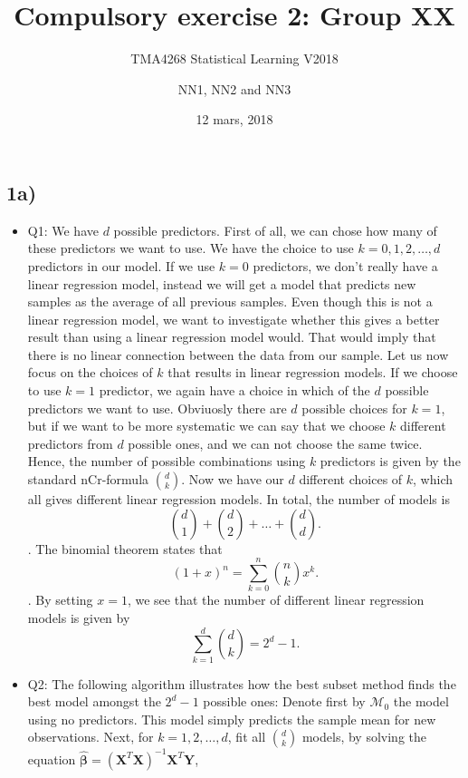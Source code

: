 \documentclass[]{article}
\title{Compulsory exercise 2: Group XX}
\subtitle{TMA4268 Statistical Learning V2018}
\author{NN1, NN2 and NN3}
\date{12 mars, 2018}
\providecommand{\tightlist}{%
  \setlength{\itemsep}{0pt}\setlength{\parskip}{0pt}}
\begin{document}
\maketitle

\subsection{1a)}\label{a}

\begin{itemize}
\tightlist
\item
  Q1: We have \(d\) possible predictors. First of all, we can chose how
  many of these predictors we want to use. We have the choice to use
  \(k=0,1,2,\dots,d\) predictors in our model. If we use \(k=0\)
  predictors, we don't really have a linear regression model, instead we
  will get a model that predicts new samples as the average of all
  previous samples. Even though this is not a linear regression model,
  we want to investigate whether this gives a better result than using a
  linear regression model would. That would imply that there is no
  linear connection between the data from our sample. Let us now focus
  on the choices of \(k\) that results in linear regression models. If
  we choose to use \(k=1\) predictor, we again have a choice in which of
  the \(d\) possible predictors we want to use. Obviuosly there are
  \(d\) possible choices for \(k=1\), but if we want to be more
  systematic we can say that we choose \(k\) different predictors from
  \(d\) possible ones, and we can not choose the same twice. Hence, the
  number of possible combinations using \(k\) predictors is given by the
  standard nCr-formula \(\binom{d}{k}\). Now we have our \(d\) different
  choices of \(k\), which all gives different linear regression models.
  In total, the number of models is
  \[\binom{d}{1}+\binom{d}{2}+\dots+\binom{d}{d}.\]. The binomial
  theorem states that \[(1+x)^n=\sum_{k=0}^n \binom{n}{k} x^k.\]. By
  setting \(x=1\), we see that the number of different linear regression
  models is given by \[\sum_{k=1}^d \binom{d}{k}=2^d -1.\]
\item
  Q2: The following algorithm illustrates how the best subset method
  finds the best model amongst the \(2^d-1\) possible ones: Denote first
  by \(\mathcal{M}_0\) the model using no predictors. This model simply
  predicts the sample mean for new observations. Next, for
  \(k=1,2,\dots,d\), fit all \(\binom{d}{k}\) models, by solving the
  equation
  \(\hat{\boldsymbol \beta} =(\boldsymbol X^T \boldsymbol X)^{-1} \boldsymbol X^T \boldsymbol Y\),

\end{itemize}
\end{document}
